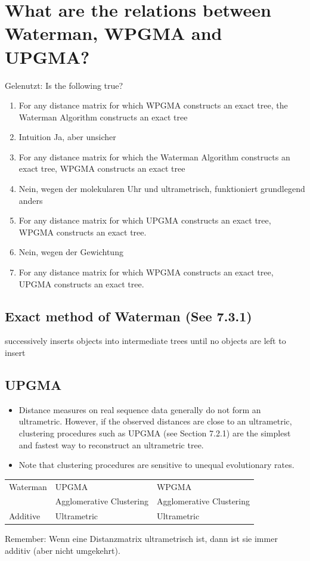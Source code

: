 \section{What are the relations between Waterman, WPGMA and UPGMA?}
Gelenutzt: \cite{scarr_upgma_wpgma, ogilvie_upgma_wpgma, enwiki1233469513}
Is the following true? 
\begin{enumerate}
    \item For any distance matrix for which WPGMA constructs an exact tree, the Waterman Algorithm constructs an exact tree
    \item[->] Intuition Ja, aber unsicher
\item For any distance matrix for which the Waterman Algorithm constructs an exact tree, WPGMA constructs an exact tree 
\item[->] Nein, wegen der molekularen Uhr und ultrametrisch, funktioniert grundlegend anders
\item For any distance matrix for which UPGMA constructs an exact tree, WPGMA constructs an exact tree.
\item[->] Nein, wegen der Gewichtung
\item For any distance matrix for which WPGMA constructs an exact tree, UPGMA constructs an exact tree.
\end{enumerate}

\subsection*{Exact method of Waterman (See 7.3.1)}
successively inserts objects into intermediate trees until no objects are left to insert

\subsection*{UPGMA}
\begin{itemize}
    \item Distance measures on real sequence data generally do not form an ultrametric. However, if the observed distances are close to an ultrametric, clustering procedures such as UPGMA (see Section 7.2.1) are the simplest and fastest way to reconstruct an ultrametric tree.
    \item Note that clustering procedures are sensitive to unequal evolutionary rates.
\end{itemize}
\begin{table}[H]
    \centering
    \begin{tabular}{p{5cm}p{5cm}p{5cm}}
        Waterman & UPGMA & WPGMA \\
         & Agglomerative Clustering & Agglomerative Clustering \\
         Additive & Ultrametric & Ultrametric  
    \end{tabular}
  
\end{table}
Remember: Wenn eine Distanzmatrix ultrametrisch ist, dann ist sie immer additiv (aber nicht umgekehrt). 



